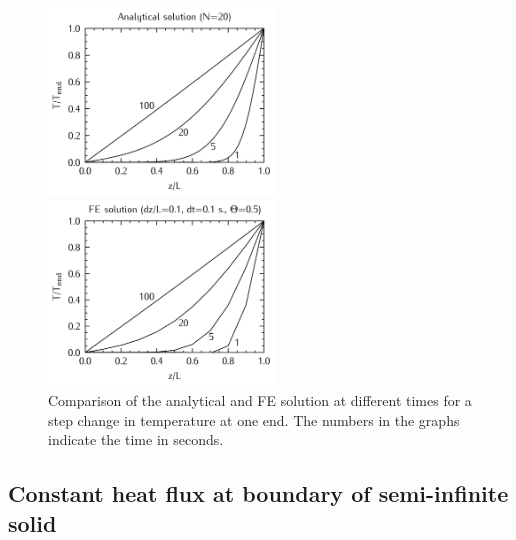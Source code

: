 \documentclass[10pt, a4paper, twoside, headinclude,footinclude, BCOR5mm]{scrartcl}
\begin{document}
\begin{figure}[tbh]
\centering
\begin{minipage}{.5\textwidth}
  \centering
  \includegraphics[width=60mm]{fig/step_analytical_sol.png}
\end{minipage}%
\begin{minipage}{.5\textwidth}
  \centering
  \includegraphics[width=60mm]{fig/step_FE_t0.5_dt0.1s.png}
\end{minipage}
\caption{Comparison of the analytical and FE solution at different times for a step change in temperature at one end. The numbers in the graphs indicate the time in seconds.}
\label{fig:step_compare}
\end{figure}

\subsection{Constant heat flux at boundary of semi-infinite solid}
\label{sec:org842b196}
\end{document}
